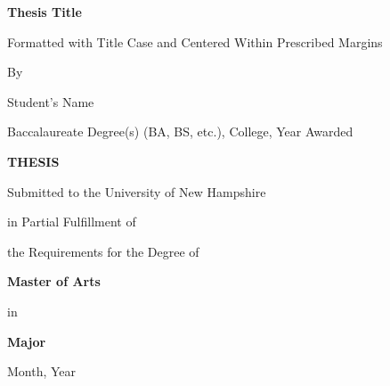\thispagestyle{empty}
\begin{center}
    \vspace*{1in}
    
    {\Large\bfseries Thesis Title\par}
    {\normalsize Formatted with Title Case and Centered Within Prescribed Margins\par}
    \vspace{0.5in}
    
    {\large By\par}
    \vspace{0.1in}
    
    {\large Student's Name\par}
    \vspace{0.1in}
    
    {\small Baccalaureate Degree(s) (BA, BS, etc.), College, Year Awarded\par}
    \vspace{0.25in}
    
    {\large\bfseries THESIS\par}
    \vspace{0.1in}
    
    {\small Submitted to the University of New Hampshire\par}
    \vspace{0.1in}
    
    {\small in Partial Fulfillment of\par}
    \vspace{0.1in}
    
    {\small the Requirements for the Degree of\par}
    \vspace{0.1in}
    
    {\large\bfseries Master of Arts\par}
    \vspace{0.1in}
    
    {\small in\par}
    \vspace{0.1in}
    
    {\large\bfseries Major\par}
    \vspace{0.25in}
    
    {\small Month, Year\par}
    
    \vspace*{\fill}
\end{center} 